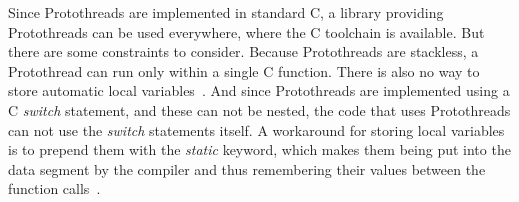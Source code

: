 Since Protothreads are implemented in standard C, a library providing Protothreads can be used everywhere,
where the C toolchain is available.
But there are some constraints to consider.
Because Protothreads are stackless, a Protothread can run only within a single C function.
There is also no way to store automatic local variables~\cite{contiki-docs}. %
And since Protothreads are implemented using a C {\it switch} statement, and these can %
not be nested, the code that uses Protothreads can not use the {\it switch} statements itself.
A workaround for storing local variables is to prepend them with the {\it static} keyword,
which makes them being put into the data segment
by the compiler and thus remembering their values between the function calls~\cite{paper-protothreads}.
